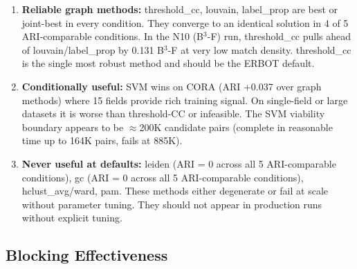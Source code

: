 \documentclass[11pt, a4paper]{article}
\begin{document}
\begin{enumerate}[leftmargin=*, label=\arabic*., noitemsep]
  \item \textbf{Reliable graph methods:} threshold\_cc, louvain, label\_prop are best
        or joint-best in every condition. They converge to an identical solution in 4 of
        5 ARI-comparable conditions. In the N10 (B$^3$-F) run, threshold\_cc pulls ahead
        of louvain/label\_prop by 0.131 B$^3$-F at very low match density.
        threshold\_cc is the single most robust method and should be the ERBOT default.
  \item \textbf{Conditionally useful:} SVM wins on CORA (ARI +0.037 over graph methods) where
        15 fields provide rich training signal. On single-field or large datasets it is worse
        than threshold-CC or infeasible. The SVM viability boundary appears to be
        $\approx$200K candidate pairs (complete in reasonable time up to 164K pairs, fails at
        885K).
  \item \textbf{Never useful at defaults:} leiden (ARI = 0 across all 5 ARI-comparable
        conditions), gc (ARI = 0 across all 5 ARI-comparable conditions), hclust\_avg/ward,
        pam. These methods either degenerate or fail at scale without parameter tuning.
        They should not appear in production runs without explicit tuning.
\end{enumerate}

\subsection{Blocking Effectiveness}
\end{document}
